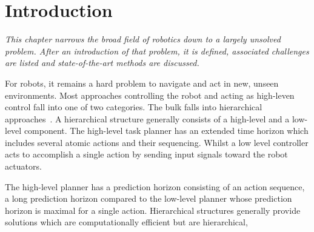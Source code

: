 \chapter{Introduction}%
\label{chap:introduction}
\textit{
This chapter narrows the broad field of robotics down to a largely unsolved problem. After an introduction of that problem, it is defined, associated challenges are listed and state-of-the-art methods are discussed.\bs
}



For robots, it remains a hard problem to navigate and act in new, unseen environments. Most approaches controlling the robot and acting as high-leven control fall into one of two categories. The bulk falls into hierarchical approaches~\cite{kaelbling_hierarchical_2011,scholz_navigation_2016,krontiris_dealing_2015}. A hierarchical structure generally consists of a high-level and a low-level component. The high-level task planner has an extended time horizon which includes several atomic actions and their sequencing. Whilst a low level controller acts to accomplish a single action by sending input signals toward the robot actuators.

The high-level planner has a prediction horizon consisting of an action sequence, a long prediction horizon compared to the low-level planner whose prediction horizon is maximal for a single action. Hierarchical structures generally provide solutions which are computationally efficient but are hierarchical,

